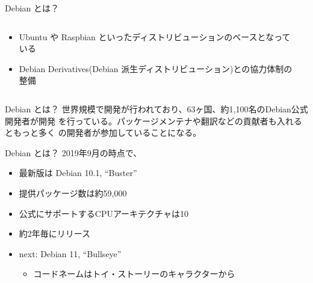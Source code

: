 \documentclass[cjk,c,squeeze,shrink,dvipdfmx,12pt,handout]{beamer}
\begin{document}
\begin{frame}[fragile]{Debian とは？}
  \begin{columns}
    \begin{column}{.58\paperwidth}
      \begin{itemize}
      \item
        Ubuntu や Raspbian といったディストリビューションのベースとなっている
      \item
        Debian Derivatives(Debian 派生ディストリビューション)との協力体制の整備
      \end{itemize}
    \end{column}
    \begin{column}{.4\paperwidth}
      \centering
    \end{column}
  \end{columns}
\end{frame}
\begin{frame}[fragile]{Debian とは？}
  世界規模で開発が行われており、63ヶ国、約1,100名のDebian公式開発者が開発
  を行っている。パッケージメンテナや翻訳などの貢献者も入れるともっと多く
  の開発者が参加していることになる。

  \begin{center}
  \end{center}
\end{frame}
\begin{frame}[fragile]{Debian とは？}
  2019年9月の時点で、
  \pause
  \begin{itemize}[<+->]
  \item
    最新版は {\alert{Debian 10.1}}, ``Buster''
  \item
    提供パッケージ数は{\alert{約59,000}}
  \item
    公式にサポートするCPUアーキテクチャは{\alert{10}}
  \item {\alert{約2年毎}}にリリース
  \item next: Debian 11, ``Bullseye''
    \begin{itemize}
    \item %
      コードネームはトイ・ストーリーのキャラクターから
    \end{itemize}
  \end{itemize}
\end{frame}
\end{document}
